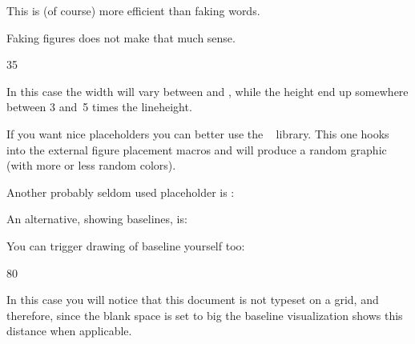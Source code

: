 This is (of course) more efficient than faking words.

\subject{Faking figures}

Faking figures does not make that much sense.

\startbuffer
\fakefigure
  [left][]
  {10em}{12em}
  {3\lineheight}{5\lineheight}

\stopbuffer

\typebuffer \getbuffer

In this case the width will vary between \type {10em} and \type {12em}, while the
height end up somewhere between 3 and~5 times the lineheight.

If you want nice placeholders you can better use the \METAPOST\ 
library. This one hooks into the external figure placement macros and will
produce a random graphic (with more or less random colors).

\startbuffer
\useMPlibrary[dum]
  {\externalfigure[ForTheMomentFaked][width=3cm,height=2cm]}

\stopbuffer

\typebuffer \getbuffer

\subject{Faking formulas}

Another probably seldom used placeholder is \type {\fakeformula}:

\startbuffer
\startformula \fakeformula \stopformula
\stopbuffer

\typebuffer \getbuffer

An alternative, showing baselines, is:

\startbuffer
\startformula \fakespacingformula \stopformula
\stopbuffer

\typebuffer \getbuffer

You can trigger drawing of baseline yourself too:

\startbuffer
\showbaselines
{} \par
{} {80} \par
{}
\stopbuffer

\typebuffer \bgroup \getbuffer \egroup

In this case you will notice that this document is not typeset on a grid, and
therefore, since the blank space is set to big the baseline visualization shows
this distance when applicable.

\stopdocument

